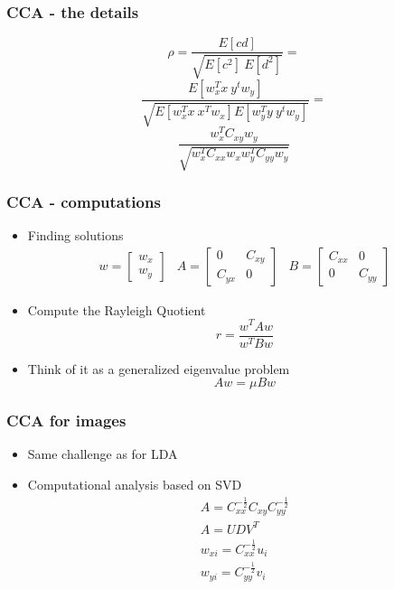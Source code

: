 \documentclass[10pt]{beamer}
\begin{document}
\begin{frame}
  \frametitle{CCA - the details}
  \[
    \rho = \frac{E[cd]}{\sqrt{E[c^2]~E[d^2]}} =
  \]
  \[
    \frac{E[w_x^T x ~ y^t w_y]}{\sqrt{ E[ w_x^T x ~x^T w_x ] E[ w_y^T y ~y^t w_y ]}} =
  \]
  \[
    \frac{w_x^T C_{xy} w_y}{\sqrt{w_x^T C_{xx} w_x w_y^T C_{yy} w_y}}
  \]
\end{frame}

\begin{frame}
  \frametitle{CCA - computations}
  \begin{itemize}
  \item Finding solutions
    \begin{eqnarray*}
      \label{eq:cca}
      w = \left[ \begin{array}{c} w_x \\ w_y \end{array} \right] &
      A = \left[ \begin{array}{cc} 0 & C_{xy} \\ C_{yx} & 0 \end{array} \right] &
      B = \left[ \begin{array}{cc} C_{xx} & 0 \\ 0 & C_{yy} \end{array} \right] 
    \end{eqnarray*}
  \item Compute the Rayleigh Quotient
    \[
      r = \frac{w^T A w}{w^T B w}
    \]
  \item Think of it as a generalized eigenvalue problem
    \[
      A w = \mu B w
    \]
  \end{itemize}
\end{frame}

\begin{frame}
  \frametitle{CCA for images}
  \begin{itemize}
  \item Same challenge as for LDA
  \item Computational analysis based on SVD
    \begin{eqnarray*}
      \label{eq:cca2}
      A = C_{xx}^{-\frac{1}{2}}C_{xy}C_{yy}^{-\frac{1}{2}}\\
      A = U D V^T \\
      w_{xi} = C_{xx}^{-\frac{1}{2}} u_i\\
      w_{yi} = C_{yy}^{-\frac{1}{2}} v_i
    \end{eqnarray*}
  \end{itemize}
\end{frame}
\end{document}
